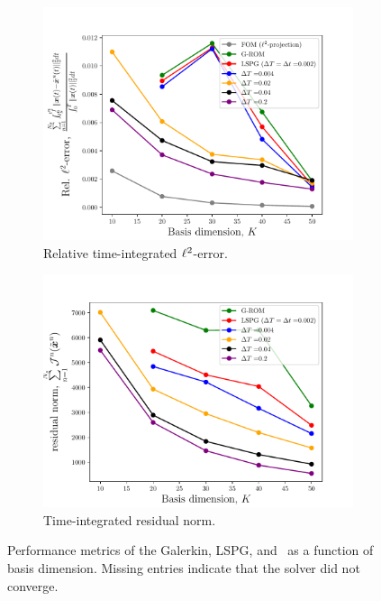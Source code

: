 \begin{figure}
\begin{center}
\begin{subfigure}[t]{0.45\textwidth}
\includegraphics[width=1.\linewidth]{figs/sod/error_converge.pdf}
\caption{Relative time-integrated $\ell^2$-error.}
\label{fig:sod_error_converge}
\end{subfigure}
\begin{subfigure}[t]{0.45\textwidth}
\includegraphics[width=1.\linewidth]{figs/sod/residual_converge.pdf}
\caption{Time-integrated residual norm.} 
\label{fig:sod_residual_converge}
\end{subfigure}
\caption{Performance metrics of the Galerkin, LSPG, and \methodAcronymROMs\ as a function of basis dimension. Missing entries indicate that the solver did not converge.} 
\label{fig:convergence_study}
\end{center}
\end{figure}

